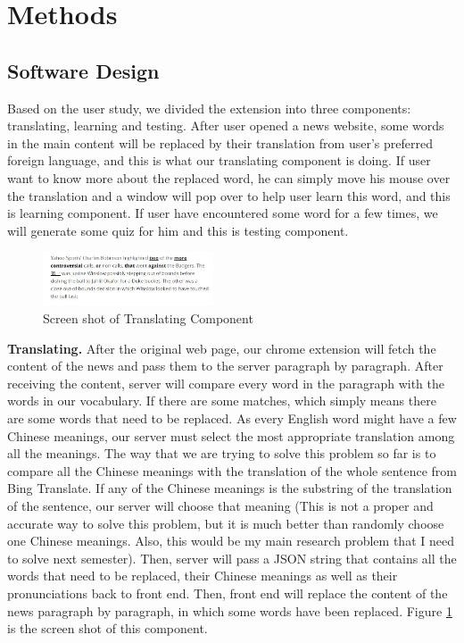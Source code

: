 \section{Methods}

\subsection{Software Design}
Based on the user study, we divided the extension into three components: translating, learning and testing. After user opened a news website, 
some words in the main content will be replaced by their translation from user's preferred foreign language, and this is what our translating 
component is doing. If user want to know more about the replaced word, he can simply move his mouse over the translation and a window will pop 
over to help user learn this word, and this is learning component. If user have encountered some word for a few times, we will generate some 
quiz for him and this is testing component.

\begin{figure}[ht]
  \centering
  \includegraphics[width=0.45\textwidth]{software_design_2.jpg}
  \caption{Screen shot of Translating Component}
  \label{fig:software_design_2}
\end{figure}
{\bf Translating.} After the original web page, our chrome extension will fetch the content of the news and pass them to the server paragraph by paragraph. After receiving the content, server will compare every word in the paragraph with the words in our vocabulary. If there are some matches, which simply means there are some words that need to be replaced. As every English word might have a few Chinese meanings, our server must select the most appropriate translation among all the meanings. The way that we are trying to solve this problem so far is to compare all the Chinese meanings with the translation of the whole sentence from Bing Translate. If any of the Chinese meanings is the substring of the translation of the sentence, our server will choose that meaning (This is not a proper and accurate way to solve this problem, but it is much better than randomly choose one Chinese meanings. Also, this would be my main research problem that I need to solve next semester). Then, server will pass a JSON string that contains all the words that need to be replaced, their Chinese meanings as well as their pronunciations back to front end. Then, front end will replace the content of the news paragraph by paragraph, in which some words have been replaced. Figure \ref{fig:software_design_2} is the screen shot of this component.

